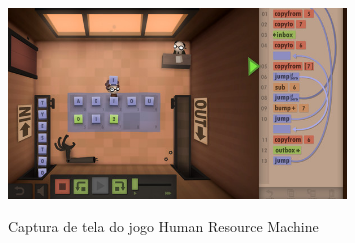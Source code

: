 \begin{figure}[H]
	\centering
	\caption{Captura de tela do jogo Human Resource Machine}
	\includegraphics[width=0.8\textwidth]{images/human-resource-machine.jpg}
	\label{fig:hrm}
\end{figure}
